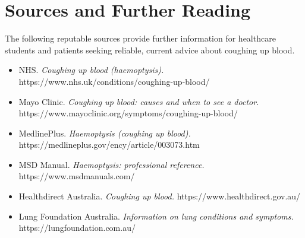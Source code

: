 \section*{Sources and Further Reading}
The following reputable sources provide further information for healthcare students and patients seeking reliable, current advice about coughing up blood.

\begin{itemize}
    \item NHS. \textit{Coughing up blood (haemoptysis).} https://www.nhs.uk/conditions/coughing-up-blood/
    \item Mayo Clinic. \textit{Coughing up blood: causes and when to see a doctor.} https://www.mayoclinic.org/symptoms/coughing-up-blood/
    \item MedlinePlus. \textit{Haemoptysis (coughing up blood).} https://medlineplus.gov/ency/article/003073.htm
    \item MSD Manual. \textit{Haemoptysis: professional reference.} https://www.msdmanuals.com/
    \item Healthdirect Australia. \textit{Coughing up blood.} https://www.healthdirect.gov.au/
    \item Lung Foundation Australia. \textit{Information on lung conditions and symptoms.} https://lungfoundation.com.au/
\end{itemize}
